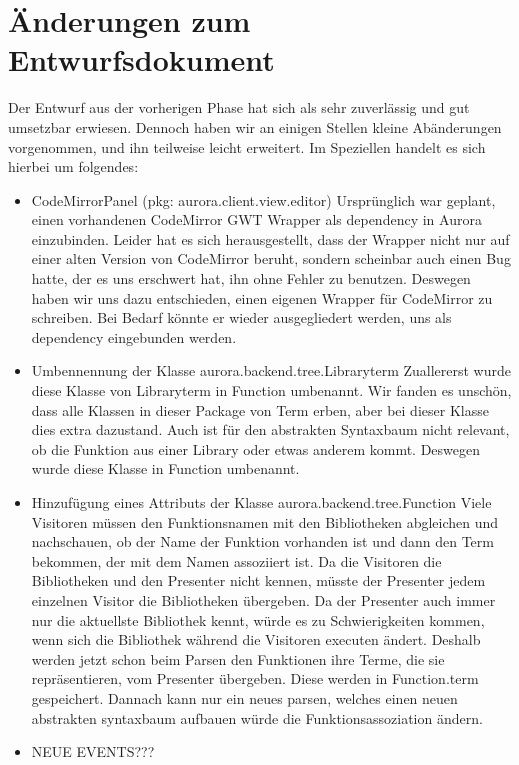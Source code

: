 \documentclass[parskip=full,11pt,twoside]{scrartcl}
\begin{document}
\section{Änderungen zum Entwurfsdokument}
Der Entwurf aus der vorherigen Phase hat sich als sehr zuverlässig und gut umsetzbar erwiesen.
Dennoch haben wir an einigen Stellen kleine Abänderungen vorgenommen, und ihn teilweise leicht erweitert.
Im Speziellen handelt es sich hierbei um folgendes:
\begin{itemize}
    \item CodeMirrorPanel (pkg: aurora.client.view.editor)
    \newline
    Ursprünglich war geplant, einen vorhandenen CodeMirror GWT Wrapper als dependency in Aurora einzubinden.
    Leider hat es sich herausgestellt, dass der Wrapper nicht nur auf einer alten Version von CodeMirror beruht, sondern scheinbar auch einen Bug hatte, der es uns erschwert hat, ihn ohne Fehler zu benutzen.
    Deswegen haben wir uns dazu entschieden, einen eigenen Wrapper für CodeMirror zu schreiben.
    Bei Bedarf könnte er wieder ausgegliedert werden, uns als dependency eingebunden werden.
	
	\item Umbennennung der Klasse aurora.backend.tree.Libraryterm
	\newline
	Zuallererst wurde diese Klasse von Libraryterm in Function umbenannt. Wir fanden es unschön, dass alle Klassen in dieser Package von Term erben, aber bei dieser Klasse dies extra dazustand. Auch ist für den abstrakten Syntaxbaum nicht relevant, ob die Funktion aus einer Library oder etwas anderem kommt. Deswegen wurde diese Klasse in Function umbenannt.
	
	\item Hinzufügung eines Attributs der Klasse aurora.backend.tree.Function
	\newline
	Viele Visitoren müssen den Funktionsnamen mit den Bibliotheken abgleichen und nachschauen, ob der Name der Funktion vorhanden ist und 		dann den Term bekommen, der mit dem Namen assoziiert ist. Da die Visitoren die Bibliotheken und den Presenter nicht kennen, müsste der 	Presenter jedem einzelnen Visitor die Bibliotheken übergeben. Da der Presenter auch immer nur die aktuellste Bibliothek kennt, würde 		es zu Schwierigkeiten kommen, wenn sich die Bibliothek während die Visitoren executen ändert. 
	Deshalb werden jetzt schon beim Parsen den Funktionen ihre Terme, die sie repräsentieren, vom Presenter übergeben.
	Diese werden in Function.term gespeichert. Dannach kann nur ein neues parsen, welches einen neuen abstrakten syntaxbaum aufbauen würde 	die Funktionsassoziation ändern.
	
	
	
	
    \item NEUE EVENTS???
\end{itemize}
\end{document}
